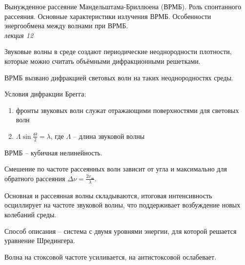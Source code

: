 
\begin{leftrules}
Вынужденное рассеяние Мандельштама-Бриллюена (ВРМБ). Роль спонтанного рассеяния. Основные характеристики излучения ВРМБ. Особенности энергообмена между волнами при ВРМБ.
\\ \phantom{42} \hfill \textit{лекция 12} 
\end{leftrules}

Звуковые волны в среде создают периодические неоднородности плотности, которые можно считать
объёмными дифракционными решетками.

ВРМБ вызвано дифракцией световых волн на таких неоднородностях среды.

Условия дифракции Брегга:
\begin{enumerate}
    \item фронты звуковых волн служат отражающими поверхностями для световых волн
    \item $\Lambda \sin \frac{\Theta}{2} = \lambda$, где $\Lambda$ -- длина звуковой волны
\end{enumerate}

ВРМБ -- кубичная нелинейность.

Смешение по частоте рассеянных волн зависит от угла и максимально для обратного рассеяния $\Delta \nu = \frac{2 v_{\text{зв}}}{\lambda}$.

Основная и рассеянная волны складываются, итоговая интенсивность осциллирует на частоте звуковой волны, что поддерживает возбуждение новых колебаний среды.

Способ описания -- система с двумя уровнями энергии, для которой решается уравнение Шредингера.

Волна на стоксовой частоте усиливается, на антистоксовой ослабевает.
